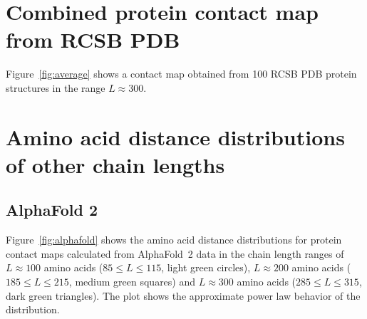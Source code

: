 \documentclass[10pt]{iopart}
\begin{document}
\section*{Combined protein contact map from RCSB PDB}

Figure~\ref{fig:average} shows a contact map obtained from 100 RCSB PDB protein structures in the range $L \approx 300$. 


\begin{figure}[htb]
\end{figure}

\section{Amino acid distance distributions of other chain lengths}
\subsection{AlphaFold 2}
Figure~\ref{fig:alphafold} shows the amino acid distance distributions for protein contact maps calculated from AlphaFold~2 data in the chain length ranges of $L \approx 100$ amino acids ($85 \leq L \leq 115$, light green circles), $L \approx 200$ amino acids ($185 \leq L \leq 215$, medium green squares) and $L \approx 300$ amino acids ($285 \leq L \leq 315$, dark green triangles). The plot shows the approximate power law behavior of the distribution. 
\end{document}
